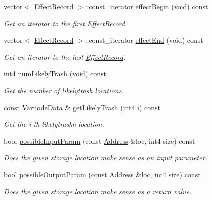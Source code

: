 \begin{DoxyCompactItemize}
vector$<$ \mbox{\hyperlink{class_effect_record}{Effect\+Record}} $>$\+::const\+\_\+iterator \mbox{\hyperlink{class_proto_model_a5c9fa95940e32b03d475257ca177cfaa}{effect\+Begin}} (void) const
\begin{DoxyCompactList}\small\item\em Get an iterator to the first \mbox{\hyperlink{class_effect_record}{Effect\+Record}}. \end{DoxyCompactList}\item 
vector$<$ \mbox{\hyperlink{class_effect_record}{Effect\+Record}} $>$\+::const\+\_\+iterator \mbox{\hyperlink{class_proto_model_ac5eccb4ede5b877d6256cbbc2b9f4666}{effect\+End}} (void) const
\begin{DoxyCompactList}\small\item\em Get an iterator to the last \mbox{\hyperlink{class_effect_record}{Effect\+Record}}. \end{DoxyCompactList}\item 
int4 \mbox{\hyperlink{class_proto_model_a8d1f841c8f099cc2f124b8257c51d50f}{num\+Likely\+Trash}} (void) const
\begin{DoxyCompactList}\small\item\em Get the number of {\itshape likelytrash} locations. \end{DoxyCompactList}\item 
const \mbox{\hyperlink{struct_varnode_data}{Varnode\+Data}} \& \mbox{\hyperlink{class_proto_model_a1e6449c1c7d16d6ec396d29e58042cad}{get\+Likely\+Trash}} (int4 i) const
\begin{DoxyCompactList}\small\item\em Get the i-\/th {\itshape likelytrashh} location. \end{DoxyCompactList}\item 
bool \mbox{\hyperlink{class_proto_model_a1c0e6fe360413702b20cd04367dc477f}{possible\+Input\+Param}} (const \mbox{\hyperlink{class_address}{Address}} \&loc, int4 size) const
\begin{DoxyCompactList}\small\item\em Does the given storage location make sense as an input parameter. \end{DoxyCompactList}\item 
bool \mbox{\hyperlink{class_proto_model_aea2696911b81cc71cc68d927d7c02204}{possible\+Output\+Param}} (const \mbox{\hyperlink{class_address}{Address}} \&loc, int4 size) const
\begin{DoxyCompactList}\small\item\em Does the given storage location make sense as a return value. \end{DoxyCompactList}\item 

\end{DoxyCompactItemize}
